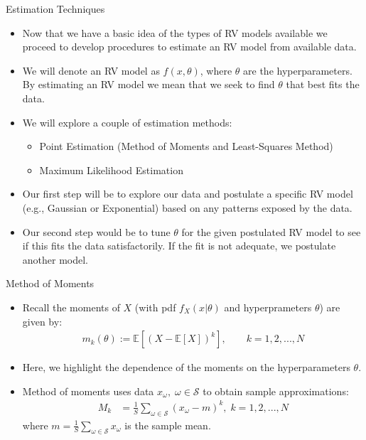 \documentclass[9pt]{beamer}
\begin{document}
%
\begin{frame}{Estimation Techniques}


\begin{itemize}
\item Now that we have a basic idea of the types of RV models available we proceed to develop procedures to estimate an RV model from available data. 

\item We will denote an RV model as $f(x,\theta)$, where $\theta$ are the hyperparameters. By estimating an RV model we mean that we seek to find $\theta$ that best fits the data.

\item We will explore a couple of estimation methods:
\begin{itemize}
\item Point Estimation (Method of Moments and Least-Squares Method)

\item Maximum Likelihood Estimation
\end{itemize}
\item Our first step will be to explore our data and postulate a specific RV model (e.g., Gaussian or Exponential) based on any patterns exposed by the data. 
\item Our second step would be to tune $\theta$ for the given postulated RV model to see if this fits the data satisfactorily. If the fit is not adequate, we postulate another model.
\end{itemize}

\end{frame}

\begin{frame}{Method of Moments}

\begin{itemize}
\item Recall the moments of $X$ (with pdf $f_X(x|\theta)$ and hyperprameters $\theta$) are given by:
\begin{align*}
m_k(\theta):=\mathbb{E}[(X-\mathbb{E}[X])^k], \qquad k=1,2,...,N
\end{align*}
\item Here, we highlight the dependence of the moments on the hyperparameters $\theta$. 

\item Method of moments uses data $x_\omega,\; \omega \in \mathcal{S}$ to obtain sample approximations: 
\begin{align*}
M_k&=\frac{1}{S}\sum_{\omega\in \mathcal{S}}(x_\omega-m)^k, \; k=1,2,...,N
\end{align*}
where $m=\frac{1}{S}\sum_{\omega\in \mathcal{S}}x_\omega$ is the sample mean.

\end{itemize}

\end{frame}
\end{document}
